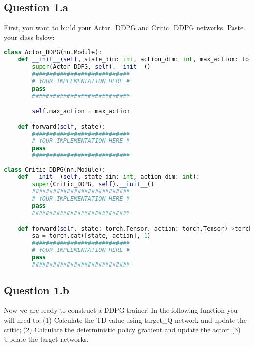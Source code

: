 \documentclass[12pt]{article}
\begin{document}
\subsection*{Question 1.a} 
First, you want to build your Actor\_DDPG and Critic\_DDPG networks.
Paste your class below:
\begin{solution}
\begin{lstlisting}[language=Python]
class Actor_DDPG(nn.Module):
	def __init__(self, state_dim: int, action_dim: int, max_action: torch.tensor):
		super(Actor_DDPG, self).__init__()
		############################
		# YOUR IMPLEMENTATION HERE #
		pass
		############################

		self.max_action = max_action

	def forward(self, state):
		############################
		# YOUR IMPLEMENTATION HERE #
		pass
		############################
\end{lstlisting}
\begin{lstlisting}[language=Python]
class Critic_DDPG(nn.Module):
	def __init__(self, state_dim: int, action_dim: int):
		super(Critic_DDPG, self).__init__()
		############################
		# YOUR IMPLEMENTATION HERE #
		pass
		############################

	def forward(self, state: torch.Tensor, action: torch.Tensor)->torch.Tensor:
		sa = torch.cat([state, action], 1)
		############################
		# YOUR IMPLEMENTATION HERE #
		pass
		############################
\end{lstlisting}
\end{solution}

\subsection*{Question 1.b} 
Now we are ready to construct a DDPG trainer! In the following function you will need to: (1) Calculate the TD value using target\_Q network and update the critic; (2) Calculate the deterministic policy gradient and update the actor;
(3) Update the target networks.
\end{document}
